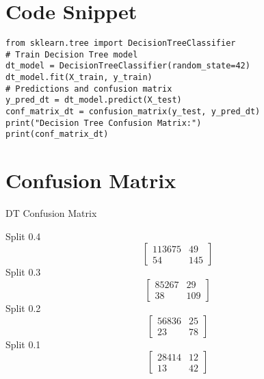 \documentclass[12pt,a4paper]{report}
\begin{document}
\section{Code Snippet}
\begin{lstlisting}
from sklearn.tree import DecisionTreeClassifier
# Train Decision Tree model
dt_model = DecisionTreeClassifier(random_state=42)
dt_model.fit(X_train, y_train)
# Predictions and confusion matrix
y_pred_dt = dt_model.predict(X_test)
conf_matrix_dt = confusion_matrix(y_test, y_pred_dt)
print("Decision Tree Confusion Matrix:")
print(conf_matrix_dt)
\end{lstlisting}

\section{Confusion Matrix}
DT Confusion Matrix\par
\vspace{0.5cm}
Split 0.4
\[
\begin{bmatrix}
  113675 & 49\\
 54 & 145
\end{bmatrix}
\]
Split 0.3
\[
\begin{bmatrix}
 85267 & 29\\
  38 & 109
\end{bmatrix}
\]
Split 0.2
\[
\begin{bmatrix}
  56836 & 25\\
  23 & 78
\end{bmatrix}
\]
Split 0.1
\[
\begin{bmatrix}
  28414 & 12\\
  13 & 42
\end{bmatrix}
\]
\end{document}
